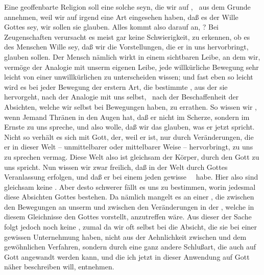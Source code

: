 Eine geoffenbarte Religion soll eine solche seyn, die wir auf , \dh\ aus dem Grunde annehmen, weil wir auf irgend eine Art eingesehen haben, daß es der Wille Gottes sey, wir sollen sie glauben. Alles kommt also darauf an, ? Bei  Zeugenschaften verursacht es meist gar keine Schwierigkeit, zu erkennen, ob es des Menschen Wille sey, daß wir die Vorstellungen, die er in uns hervorbringt, glauben sollen. Der Mensch nämlich wirkt in einem sichtbaren Leibe, an dem wir, vermöge der Analogie mit unserm eigenen Leibe, jede willkürliche Bewegung sehr leicht von einer unwillkürlichen zu unterscheiden wissen; und fast eben so leicht wird es bei jeder Bewegung der erstern Art, die bestimmte , aus der sie hervorgeht, nach der Analogie mit uns selbst, \dh\ nach der Beschaffenheit der Absichten, welche wir selbst bei  Bewegungen haben, zu errathen. So wissen wir \zB , wenn Jemand Thränen in den Augen hat, daß er nicht im Scherze, sondern im Ernste zu uns spreche, und also wolle, daß wir das glauben, was er jetzt spricht. Nicht so verhält es sich mit Gott, der, weil er  ist, nur durch Veränderungen, die er in dieser  Welt -- unmittelbarer oder mittelbarer Weise -- hervorbringt, zu uns zu sprechen vermag. Diese Welt also ist gleichsam der Körper, durch den Gott zu uns spricht. Nun wissen wir zwar freilich, daß  in der Welt durch Gottes Veranlassung erfolgen, und daß er bei einem jeden gewisse~\  habe. Hier also sind gleichsam keine . Aber desto schwerer fällt es uns zu bestimmen, worin jedesmal diese Absichten Gottes bestehen. Da nämlich mangelt es an einer , die zwischen den Bewegungen an unserm  und zwischen den Veränderungen in der , welche in diesem Gleichnisse den  Gottes vorstellt, anzutreffen wäre. Aus dieser  der Sache folgt jedoch noch keine , zumal da wir oft selbst bei  die Absicht, die sie bei einer gewissen Unternehmung haben, nicht aus der Aehnlichkeit zwischen  und dem  gewöhnlichen Verfahren, sondern durch eine ganz andere Schlußart, die auch auf Gott angewandt werden kann, und die ich jetzt in dieser Anwendung auf Gott näher beschreiben will, entnehmen.

